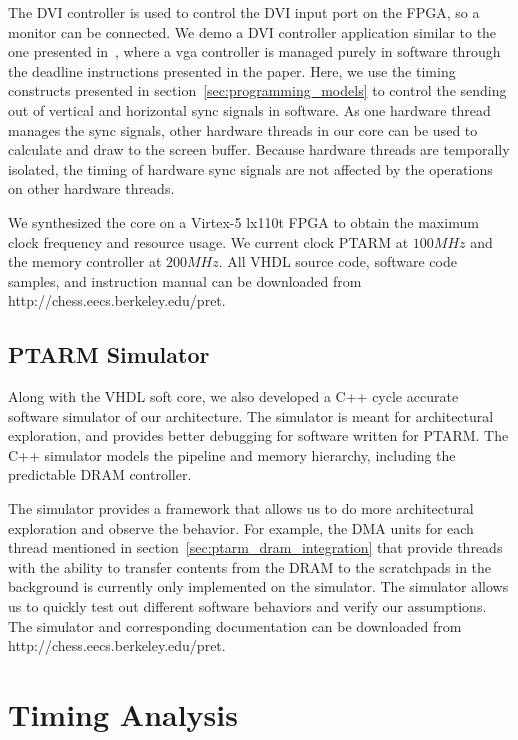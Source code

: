 The DVI controller is used to control the DVI input port on the FPGA, so a monitor can be connected.
We demo a DVI controller application similar to the one presented in~\cite{ip2006processor}, where a vga controller is managed purely in software through the deadline instructions presented in the paper.
Here, we use the timing constructs presented in section~\ref{sec:programming_models} to control the sending out of vertical and horizontal sync signals in software.
As one hardware thread manages the sync signals, other hardware threads in our core can be used to calculate and draw to the screen buffer.  
Because hardware threads are temporally isolated, the timing of hardware sync signals are not affected by the operations on other hardware threads.  

We synthesized the core on a Virtex-5 lx110t FPGA to obtain the maximum clock frequency and resource usage. 
We current clock PTARM at $100MHz$ and the memory controller at $200MHz$. 
All VHDL source code, software code samples, and instruction manual can be downloaded from http://chess.eecs.berkeley.edu/pret.   

\subsection{PTARM Simulator}
\label{sec:ptarm_sim}
Along with the VHDL soft core, we also developed a C++ cycle accurate software simulator of our architecture.
The simulator is meant for architectural exploration, and provides better debugging for software written for PTARM.  
The C++ simulator models the pipeline and memory hierarchy, including the predictable DRAM controller.  

The simulator provides a framework that allows us to do more architectural exploration and observe the behavior.
For example, the DMA units for each thread mentioned in section~\ref{sec:ptarm_dram_integration} that 
provide threads with the ability to transfer contents from the DRAM to the scratchpads in the background is currently only implemented on the simulator. 
The simulator allows us to quickly test out different software behaviors and verify our assumptions. 
The simulator and corresponding documentation can be downloaded from http://chess.eecs.berkeley.edu/pret. 


\section{Timing Analysis}
\label{sec:wcet}

